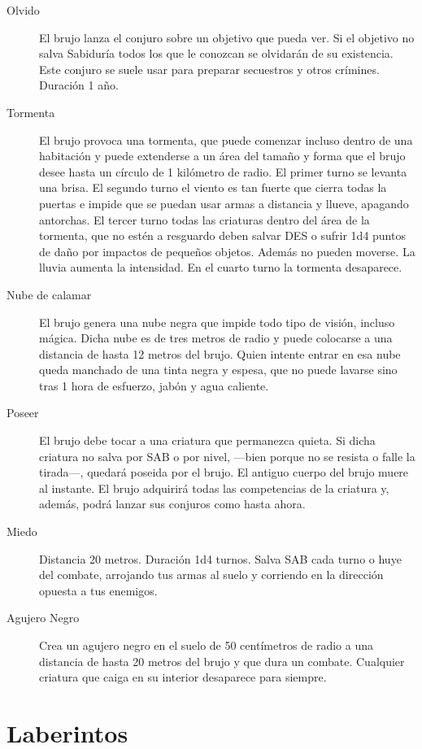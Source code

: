 \begin{multicols}{2}
\begin{description}
\item[Olvido] El brujo lanza el conjuro sobre un objetivo que pueda ver. Si el objetivo no salva Sabiduría todos los que le conozcan se olvidarán de su existencia. Este conjuro se suele usar para preparar secuestros y otros crímines. Duración 1 año.
\item[Tormenta] El brujo provoca una tormenta, que puede comenzar incluso dentro de una habitación y puede extenderse a un área del tamaño y forma que el brujo desee hasta un círculo de 1 kilómetro de radio. El primer turno se levanta una brisa. El segundo turno el viento es tan fuerte que cierra todas la puertas e impide que se puedan usar armas a distancia y llueve, apagando antorchas. El tercer turno todas las criaturas dentro del área de la tormenta, que no estén a resguardo deben salvar DES o sufrir 1d4 puntos de daño por impactos de pequeños objetos. Además no pueden moverse. La lluvia aumenta la intensidad. En el cuarto turno la tormenta desaparece.
\item[Nube de calamar] El brujo genera una nube negra que impide todo tipo de visión, incluso mágica. Dicha nube es de tres metros de radio y puede
colocarse a una distancia de hasta 12 metros del brujo. Quien intente entrar en esa nube queda manchado de una tinta negra y espesa, que no puede lavarse sino tras 1 hora de esfuerzo, jabón y agua caliente.
\item[Poseer] El brujo debe tocar a una criatura que permanezca quieta. Si dicha criatura no salva por SAB o por nivel, ---bien porque no se resista o falle la tirada---, quedará poseida por el brujo. El antiguo cuerpo del brujo muere al instante. El brujo adquirirá todas las competencias de la criatura y, además, podrá lanzar sus conjuros como hasta ahora.
\item[Miedo] Distancia 20 metros. Duración 1d4 turnos. Salva SAB cada turno o huye del combate, arrojando tus armas al suelo y corriendo en la dirección opuesta a tus enemigos.
\item[Agujero Negro] Crea un agujero negro en el suelo de 50 centímetros de radio a una distancia de hasta 20 metros del brujo y que dura un combate. Cualquier criatura que caiga en su interior desaparece para siempre.
\end{description}
\end{multicols}

\clearpage

\part{Laberintos}

